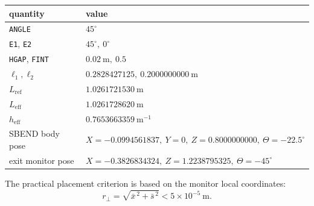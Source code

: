 \documentclass[11pt]{article}
\newcommand{\degree}{^\circ}
\newcommand{\code}[1]{\texttt{#1}}
\begin{document}
\begin{center}
\begin{tabular}{@{}ll@{}}
\toprule
quantity & value \\
\midrule
\code{ANGLE} & \(45\degree\) \\
\code{E1}, \code{E2} & \(45\degree,\ 0\degree\) \\
\code{HGAP}, \code{FINT} & \(0.02\ \mathrm{m},\ 0.5\) \\
\(\ell_1,\ell_2\) & \(0.2828427125,\ 0.2000000000\ \mathrm{m}\) \\
\(L_\mathrm{ref}\) & \(1.0261721530\ \mathrm{m}\) \\
\(L_\mathrm{eff}\) & \(1.0261728620\ \mathrm{m}\) \\
\(h_\mathrm{eff}\) & \(0.7653663359\ \mathrm{m}^{-1}\) \\
SBEND body pose & \(X=-0.0994561837,\ Y=0,\ Z=0.8000000000,\ \Theta=-22.5\degree\) \\
exit monitor pose & \(X=-0.3826834324,\ Z=1.2238795325,\ \Theta=-45\degree\) \\
\bottomrule
\end{tabular}
\end{center}

The practical placement criterion is based on the monitor local coordinates:
\[
  r_\perp = \sqrt{\bar{x}^{\,2} + \bar{s}^{\,2}} < 5\times 10^{-5}\ \mathrm{m}.
\]
\end{document}
